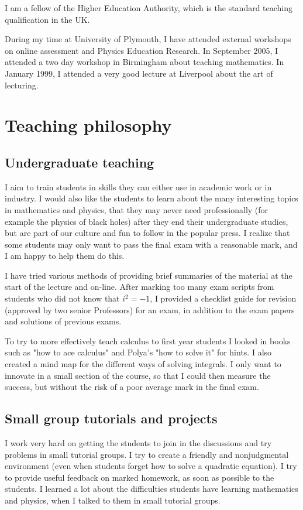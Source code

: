 \documentclass[12pt]{article}
\begin{document}
I am a fellow of the Higher Education Authority, which is the standard  teaching
qualification in the UK.

During my time at University of Plymouth, I have attended external workshops on online
assessment and Physics Education Research.  In September 2005, I
attended a two day workshop in Birmingham about teaching
mathematics. In January 1999, I attended a very good lecture at
Liverpool about the art of lecturing.


\section{Teaching philosophy} 

\subsection{Undergraduate teaching}

I aim to train students in skills they
can either use in academic work or in
industry. I would also like the students to
learn about the many interesting 
topics in mathematics and physics, that they may never 
need professionally (for example the physics of black holes)
after they end their undergraduate
studies, but are part of our culture and fun
to follow in the popular press.
I realize that some students may only want
to pass the final exam with a reasonable mark,
and I am happy to help them do this.

I have tried various methods of providing brief
summaries of the material at the start of the lecture
and on-line. After marking too many exam scripts from
students who did not know that $i^2 = -1$, I provided
a checklist guide for revision (approved by two senior
Professors) for an exam, 
in addition to the exam papers and solutions of previous exams.

To try to more effectively teach calculus to first year students I
looked in books such as "how to ace calculus" and Polya's "how to
solve it" for hints. I also created a mind map for the different ways
of solving integrals. I only want to innovate in a small section of
the course, so that I could then measure the success, but without the risk
of a poor average mark in the final exam.

\subsection{Small group tutorials and projects}


I work very hard on getting the students to join in the discussions
and try problems in small tutorial groups. I try to create
a friendly and nonjudgmental environment (even when
students forget how to solve a quadratic equation).
I try to provide useful feedback on marked homework,
as soon as possible to the students. I learned a lot
about the difficulties students have learning mathematics
and physics, when I talked to them in small tutorial
groups.
\end{document}
